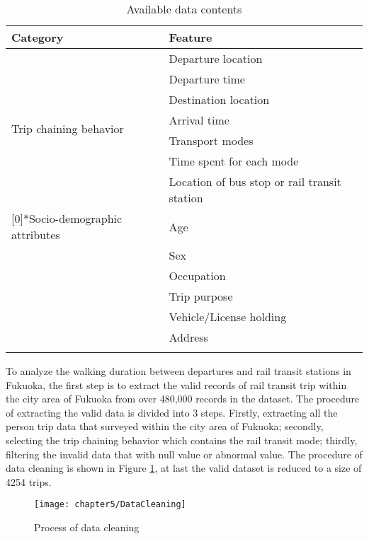 \begin{table}[htbp]
	\centering
	\caption{Available data contents}
	\label{tab:chp2:Data}
	\small
	\renewcommand{\arraystretch}{1.25} %
	\begin{tabular}{ll}
		\Xhline{1.5pt}
		Category                      & Feature\\
		\midrule
		\multirow{7}[0]{*}{Trip chaining behavior} 
		& Departure location \\
		& Departure time \\
		& Destination location \\
		& Arrival time \\
		& Transport modes \\
		& Time spent for each mode \\
		& Location of bus stop or rail transit station \\
		\Xhline{0.5pt}
		
		\multirow{6}[0]{*}{Socio-demographic attributes}
		& Age \\
		& Sex \\
		& Occupation \\
		& Trip purpose \\
		& Vehicle/License holding \\
		& Address \\
		\Xhline{1.5pt}
	\end{tabular}
\end{table}

%
To analyze the walking duration between departures and rail transit stations in Fukuoka, the first step is to extract the valid records of rail transit trip within the city area of Fukuoka from over 480,000 records in the dataset. The procedure of extracting the valid data is divided into 3 steps. Firstly, extracting all the person trip data that surveyed within the city area of Fukuoka; secondly, selecting the trip chaining behavior which contains the rail transit mode; thirdly, filtering the invalid data that with null value or abnormal value. The procedure of data cleaning is shown in Figure \ref{fig:chp2:DataCleaning}, at last the valid dataset is reduced to a size of 4254 trips.

\begin{figure}[htbp]
	\centering
	\texttt{[image: chapter5/DataCleaning]}
	\caption{Process of data cleaning}
	\label{fig:chp2:DataCleaning}
\end{figure}

